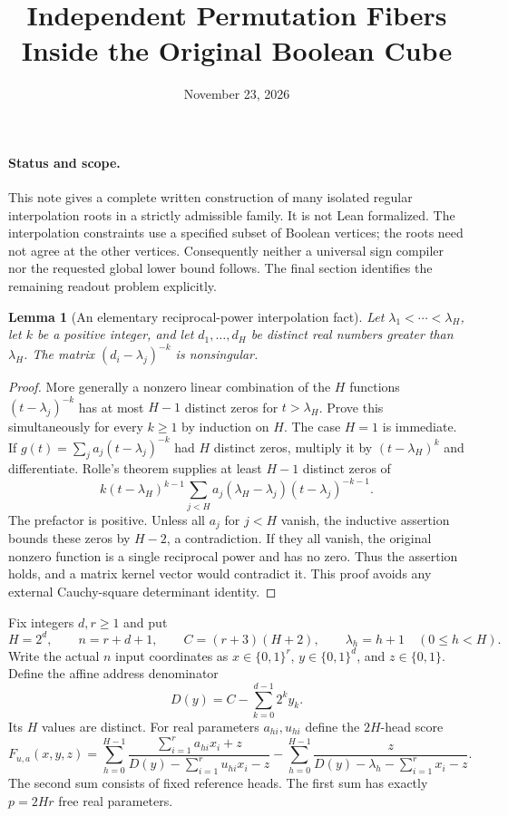 \documentclass[11pt]{article}
\title{Independent Permutation Fibers Inside the Original Boolean Cube}
\author{}
\date{November 23, 2026}
\newtheorem{lemma}[theorem]{Lemma}
\begin{document}
\maketitle

\paragraph{Status and scope.}
This note gives a complete written construction of many isolated regular
interpolation roots in a strictly admissible family. It is not Lean
formalized. The interpolation constraints use a specified subset of
Boolean vertices; the roots need not agree at the other vertices.
Consequently neither a universal sign compiler nor the requested global
lower bound follows. The final section identifies the remaining readout
problem explicitly.

\begin{lemma}[An elementary reciprocal-power interpolation fact]
Let $\lambda_1<\cdots<\lambda_H$, let $k$ be a positive integer, and
let $d_1,\ldots,d_H$ be distinct real numbers greater than $\lambda_H$.
The matrix $(d_i-\lambda_j)^{-k}$ is nonsingular.
\end{lemma}
\begin{proof}
More generally a nonzero linear combination of the $H$ functions
$(t-\lambda_j)^{-k}$ has at most $H-1$ distinct zeros for
$t>\lambda_H$. Prove this simultaneously for every $k\geq1$ by
induction on $H$. The case $H=1$ is immediate.
If
$g(t)=\sum_j a_j(t-\lambda_j)^{-k}$
had $H$ distinct zeros, multiply it by $(t-\lambda_H)^k$ and
differentiate. Rolle's theorem supplies at least $H-1$ distinct zeros
of
\[
 k(t-\lambda_H)^{k-1}
 \sum_{j<H}a_j(\lambda_H-\lambda_j)(t-\lambda_j)^{-k-1}.
\]
The prefactor is positive. Unless all $a_j$ for $j<H$ vanish, the
inductive assertion bounds these zeros by $H-2$, a contradiction.
If they all vanish, the original nonzero function is a single
reciprocal power and has no zero. Thus the assertion holds, and a
matrix kernel vector would contradict it. This proof avoids any
external Cauchy-square determinant identity.
\end{proof}

Fix integers $d,r\geq1$ and put
\[
 H=2^d,\qquad n=r+d+1,\qquad
 C=(r+3)(H+2),\qquad \lambda_h=h+1\quad(0\leq h<H).
\]
Write the actual $n$ input coordinates as
$x\in\{0,1\}^r$, $y\in\{0,1\}^d$, and $z\in\{0,1\}$.
Define the affine address denominator
\[
 D(y)=C-\sum_{k=0}^{d-1}2^k y_k.
\]
Its $H$ values are distinct. For real parameters
$a_{hi},u_{hi}$ define the $2H$-head score
\[
 F_{u,a}(x,y,z)=
 \sum_{h=0}^{H-1}
 \frac{\sum_{i=1}^r a_{hi}x_i+z}
      {D(y)-\sum_{i=1}^r u_{hi}x_i-z}
 -
 \sum_{h=0}^{H-1}
 \frac{z}{D(y)-\lambda_h-\sum_{i=1}^r x_i-z}.
 \tag{1}
\]
The second sum consists of fixed reference heads. The first sum has
exactly $p=2Hr$ free real parameters.
\end{document}
